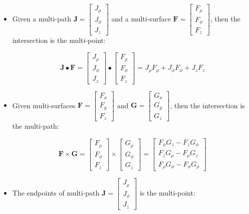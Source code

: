 \begin{itemize}
\item Given a multi-path \(\mathbf{J} = \begin{bmatrix} J_\rho \\ J_\phi \\ J_z \end{bmatrix}\) and a multi-surface \(\mathbf{F} = \begin{bmatrix} F_\rho \\ F_\phi \\ F_z \end{bmatrix}\), then the intersection is the multi-point:

\[\mathbf{J} \bullet \mathbf{F} = \begin{bmatrix} J_\rho \\ J_\phi \\ J_z \end{bmatrix} \bullet \begin{bmatrix} F_\rho \\ F_\phi \\ F_z \end{bmatrix} = J_\rho F_\rho + J_\phi F_\phi + J_z F_z\]
\item Given multi-surfaces \(\mathbf{F} = \begin{bmatrix} F_x \\ F_y \\ F_z \end{bmatrix}\) and \(\mathbf{G} = \begin{bmatrix} G_x \\ G_y \\ G_z \end{bmatrix}\), then the intersection is the multi-path:

\[\mathbf{F} \times \mathbf{G} = \begin{bmatrix} F_\rho \\ F_\phi \\ F_z \end{bmatrix} \times \begin{bmatrix} G_\rho \\ G_\phi \\ G_z \end{bmatrix}
 = \begin{bmatrix} F_\phi G_z - F_z G_\phi \\ F_z G_\rho - F_\rho G_z \\ F_\rho G_\phi - F_\phi G_\rho \end{bmatrix}\]
\item The endpoints of multi-path \(\mathbf{J} = \begin{bmatrix} J_\rho \\ J_\phi \\ J_z \end{bmatrix}\) is the multi-point:


\end{itemize}
